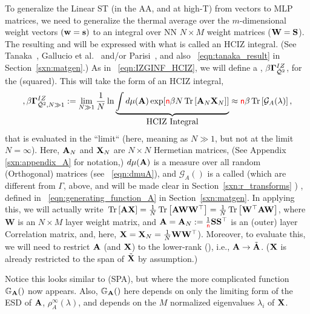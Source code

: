 To generalize the Linear ST \Perceptron (in the AA, and at high-T) from \Perceptron vectors to MLP matrices,
we need to generalize the thermal average over the $m$-dimensional \Perceptron weight vectors $({\mathbf{w}}={\mathbf{s}})$
to an integral over NN \Student $N \times M$ weight matrices (${\mathbf{W}}=\mathbf{S}$).
The resulting \PartitionFunction and \FreeEnergy will be expressed with what is called an HCIZ integral.
(See Tanaka~\cite{Tanaka2007, Tanaka2008}, Gallucio et al.~\cite{Bouchaud1998} and/or Parisi~\cite{PP95}, and also \EQN~\ref{eqn:tanaka_result} in Section~\ref{sxn:matgen}.)
As in \EQN~\ref{eqn:IZGINF_HCIZ}, we will define a \emph{\LayerQuality \GeneratingFunction}, $\beta\mathbf{\Gamma}^{IZ}_{\bar{\mathcal{Q}}^{2}}$, for the \LayerQuality (squared).
This will take the form of an HCIZ integral,
\begin{align}
\label{eqn:hciz_prelim},
\beta\mathbf{\Gamma}^{IZ}_{\bar{\mathcal{Q}}^{2},N\gg 1} := \lim_{N\gg 1}\frac{1}{N}\ln \underbrace{\int d\mu(\mathbf{A}) \exp[{\color{red}\sf{n}}\beta N\mbox{}\operatorname{Tr}\left[\mathbf{A}_N\mathbf{X}_N\right]] }_{\mbox{HCIZ Integral}} 
  \approx {\color{red}\sf{n}}\beta\mbox{}\operatorname{Tr}\left[\mathcal{G}_{A}(\lambda)\right]  ,
\end{align}
that is evaluated in the ``\LargeN limit`` (here, meaning as $N \gg 1$, but not at the limit $N=\infty$).
Here,  $\mathbf{A}_N$ and $\mathbf{X}_N$ are $N \times N$ Hermetian matrices, (See Appendix \ref{sxn:appendix_A} for notation,) $d\mu(\mathbf{A})$ is a measure
over all random (Orthogonal) matrices (see \EQN~\ref{eqn:dmuA}),
and $\mathcal{G}_{A}()$ is a called  \GEN 
(which are different from $\Gamma$, above, and will be made clear in Section~\ref{sxn:r_transforms} ) , defined in \EQN~\ref{eqn:generating_function_A} in Section~\ref{sxn:matgen}. 
In applying this, we will actually write $\mbox{}\operatorname{Tr}\left[\mathbf{A}\mathbf{X}\right]=\tfrac{1}{N}\mbox{}\operatorname{Tr}\left[\mathbf{A}{\mathbf{W}}{\mathbf{W}}^{\top}\right]=\tfrac{1}{N}\mbox{}\operatorname{Tr}\left[{\mathbf{W}}^{\top}\mathbf{A}{\mathbf{W}}\right]$,
where $\mathbf{W}$ is an $N \times M$ layer weight matrix, and $\mathbf{A}=\mathbf{A}_N:=\tfrac{1}{{\color{red}\sf{n}}}{\mathbf{S}}{\mathbf{S}}^{\top}$ is an (outer) layer
Correlation matrix, and, here,  $\mathbf{X}=\mathbf{X}_N=\tfrac{1}{N}{\mathbf{W}}{\mathbf{W}}^{\top}$).
Moreover, to evaluate this, we will need to restrict $\mathbf{A}$ (and $\mathbf{X}$)
to the lower-rank \EffectiveCorrelationSpace (\ECS),  i.e., $\mathbf{A}\rightarrow\tilde{\mathbf{A}}$. ($\mathbf{X}$ is already restricted to the span of $\tilde{\mathbf{X}}$ by \ECS assumption.)

Notice this looks similar to \SaddlePointApproximation (SPA), but where the more complicated function
$\mathbb{G}_{\mathbf{A}}()$ now appears.
Also, $\mathbb{G}_{\mathbf{A}}()$ here depends on only the limiting form of the ESD of $\mathbf{A}$, $\rho^{\infty}_{A}(\lambda)$,
and depends on the $M$ normalized eigenvalues $\lambda_{i}$ of $\mathbf{X}$.

